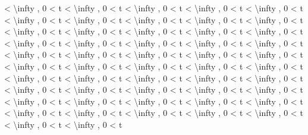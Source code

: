 \documentclass[
]{article}
\begin{document}
{\textless{} \textbackslash infty , 0 \textless{} t \textless{}
\textbackslash infty , 0 \textless{} t \textless{} \textbackslash infty
, 0 \textless{} t \textless{} \textbackslash infty , 0 \textless{} t
\textless{} \textbackslash infty , 0 \textless{} t \textless{}
\textbackslash infty , 0 \textless{} t \textless{} \textbackslash infty
, 0 \textless{} t \textless{} \textbackslash infty , 0 \textless{} t
\textless{} \textbackslash infty , 0 \textless{} t \textless{}
\textbackslash infty , 0 \textless{} t \textless{} \textbackslash infty
, 0 \textless{} t \textless{} \textbackslash infty , 0 \textless{} t
\textless{} \textbackslash infty , 0 \textless{} t \textless{}
\textbackslash infty , 0 \textless{} t \textless{} \textbackslash infty
, 0 \textless{} t \textless{} \textbackslash infty , 0 \textless{} t
\textless{} \textbackslash infty , 0 \textless{} t \textless{}
\textbackslash infty , 0 \textless{} t \textless{} \textbackslash infty
, 0 \textless{} t \textless{} \textbackslash infty , 0 \textless{} t
\textless{} \textbackslash infty , 0 \textless{} t \textless{}
\textbackslash infty , 0 \textless{} t \textless{} \textbackslash infty
, 0 \textless{} t \textless{} \textbackslash infty , 0 \textless{} t
\textless{} \textbackslash infty , 0 \textless{} t \textless{}
\textbackslash infty , 0 \textless{} t \textless{} \textbackslash infty
, 0 \textless{} t \textless{} \textbackslash infty , 0 \textless{} t
\textless{} \textbackslash infty , 0 \textless{} t \textless{}
\textbackslash infty , 0 \textless{} t \textless{} \textbackslash infty
, 0 \textless{} t \textless{} \textbackslash infty , 0 \textless{} t
\textless{} \textbackslash infty , 0 \textless{} t \textless{}
\textbackslash infty , 0 \textless{} t \textless{} \textbackslash infty
, 0 \textless{} t \textless{} \textbackslash infty , 0 \textless{} t
\textless{} \textbackslash infty , 0 \textless{} t \textless{}
\textbackslash infty , 0 \textless{} t \textless{} \textbackslash infty
, 0 \textless{} t \textless{} \textbackslash infty , 0 \textless{} t
\textless{} \textbackslash infty , 0 \textless{} t \textless{}
\textbackslash infty , 0 \textless{} t \textless{} \textbackslash infty
, 0 \textless{} t \textless{} \textbackslash infty , 0 \textless{} t
\textless{} \textbackslash infty , 0 \textless{} t \textless{}
\textbackslash infty , 0 \textless{} t \textless{} \textbackslash infty
, 0 \textless{} t \textless{} \textbackslash infty , 0 \textless{} t
\textless{} \textbackslash infty , 0 \textless{} t \textless{}
\textbackslash infty , 0 \textless{} t \textless{} \textbackslash infty
, 0 \textless{} t \textless{} \textbackslash infty , 0 \textless{} t
}
\end{document}
